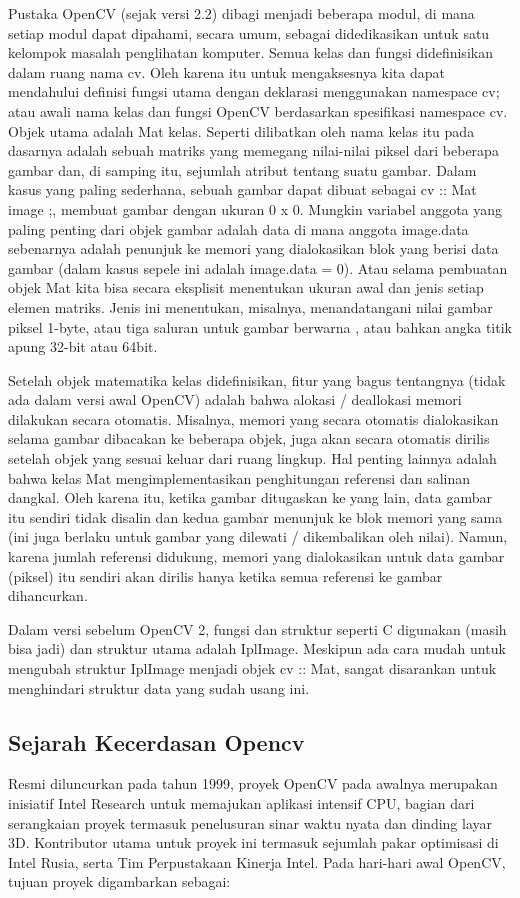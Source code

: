 	Pustaka OpenCV (sejak versi 2.2) dibagi menjadi beberapa modul, di mana setiap modul dapat dipahami, secara umum, sebagai didedikasikan untuk satu kelompok masalah penglihatan komputer. Semua kelas dan fungsi didefinisikan dalam ruang nama cv. Oleh karena itu untuk mengaksesnya kita dapat mendahului definisi fungsi utama dengan deklarasi menggunakan namespace cv; atau awali nama kelas dan fungsi OpenCV berdasarkan spesifikasi namespace cv. Objek utama adalah Mat kelas. Seperti dilibatkan oleh nama kelas itu pada dasarnya adalah sebuah matriks yang memegang nilai-nilai piksel dari beberapa gambar dan, di samping itu, sejumlah atribut tentang suatu gambar. Dalam kasus yang paling sederhana, sebuah gambar dapat dibuat sebagai cv :: Mat image ;, membuat gambar dengan ukuran 0 x 0. Mungkin variabel anggota yang paling penting dari objek gambar adalah data di mana anggota image.data sebenarnya adalah penunjuk ke memori yang dialokasikan blok yang berisi data gambar (dalam kasus sepele ini adalah image.data = 0). Atau selama pembuatan objek Mat kita bisa secara eksplisit menentukan ukuran awal dan jenis setiap elemen matriks. Jenis ini menentukan, misalnya, menandatangani nilai gambar piksel 1-byte, atau tiga saluran untuk gambar berwarna , atau bahkan angka titik apung 32-bit atau 64bit.

	Setelah objek matematika kelas didefinisikan, fitur yang bagus tentangnya (tidak ada dalam versi awal OpenCV) adalah bahwa alokasi / deallokasi memori dilakukan secara otomatis. Misalnya, memori yang secara otomatis dialokasikan selama gambar dibacakan ke beberapa objek, juga akan secara otomatis dirilis setelah objek yang sesuai keluar dari ruang lingkup. Hal penting lainnya adalah bahwa kelas Mat mengimplementasikan penghitungan referensi dan salinan dangkal. Oleh karena itu, ketika gambar ditugaskan ke yang lain, data gambar itu sendiri tidak disalin dan kedua gambar menunjuk ke blok memori yang sama (ini juga berlaku untuk gambar yang dilewati / dikembalikan oleh nilai). Namun, karena jumlah referensi didukung, memori yang dialokasikan untuk data gambar (piksel) itu sendiri akan dirilis hanya ketika semua referensi ke gambar dihancurkan.

	Dalam versi sebelum OpenCV 2, fungsi dan struktur seperti C digunakan (masih bisa jadi) dan struktur utama adalah IplImage. Meskipun ada cara mudah untuk mengubah struktur IplImage menjadi objek cv :: Mat, sangat disarankan untuk menghindari struktur data yang sudah usang ini.

\newpage
\subsection{Sejarah Kecerdasan Opencv}
    Resmi diluncurkan pada tahun 1999, proyek OpenCV pada awalnya merupakan inisiatif Intel Research untuk memajukan aplikasi intensif CPU, bagian dari serangkaian proyek termasuk penelusuran sinar waktu nyata dan dinding layar 3D. Kontributor utama untuk proyek ini termasuk sejumlah pakar optimisasi di Intel Rusia, serta Tim Perpustakaan Kinerja Intel. Pada hari-hari awal OpenCV, tujuan proyek digambarkan sebagai:

